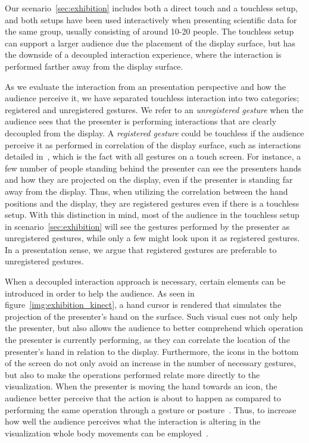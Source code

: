 \documentclass[review,journal]{vgtc}         %
\begin{document}
Our scenario~\ref{sec:exhibition} includes both a direct touch and a touchless setup, and both setups have been used interactively when presenting scientific data for the same group, usually consisting of around 10-20 people.
The touchless setup can support a larger audience due the placement of the display surface, but has the downside of a decoupled interaction experience, where the interaction is performed farther away from the display surface.

As we evaluate the interaction from an presentation perspective and how the audience perceive it, we have separated touchless interaction into two categories; registered and unregistered gestures.
We refer to an \emph{unregistered gesture} when the audience sees that the presenter is performing interactions that are clearly decoupled from the display. 
A \emph{registered gesture} could be touchless if the audience perceive it as performed in correlation of the display surface, such as interactions detailed in~\cite{Bezerianos:2007:DSU:1467769}, which is the fact with all gestures on a touch screen. 
For instance, a few number of people standing behind the presenter can see the presenters hands and how they are projected on the display, even if the presenter is standing far away from the display.
Thus, when utilizing the correlation between the hand positions and the display, they are registered gestures even if there is a touchless setup.
With this distinction in mind, most of the audience in the touchless setup in scenario~\ref{sec:exhibition} will see the gestures performed by the presenter as unregistered gestures, while only a few might look upon it as registered gestures.
In a presentation sense, we argue that registered gestures are preferable to unregistered gestures.
 
When a decoupled interaction approach is necessary, certain elements can be introduced in order to help the audience.
As seen in figure~\ref{img:exhibition_kinect}, a hand cursor is rendered that simulates the projection of the presenter's hand on the surface.
Such visual cues not only help the presenter, but also allows the audience to better comprehend which operation the presenter is currently performing, as they can correlate the location of the presenter's hand in relation to the display.
Furthermore, the icons in the bottom of the screen do not only avoid an increase in the number of necessary gestures, but also to make the operations performed relate more directly to the visualization. 
When the presenter is moving the hand towards an icon, the audience better perceive that the action is about to happen as compared to performing the same operation through a gesture or posture~\cite{isenberg:hal-00781237}. 
Thus, to increase how well the audience perceives what the interaction is altering in the visualization whole body movements can be employed~\cite{978-0-85729-432-6, Shoemaker:2010:BIT:1868914.1868967}. 
\end{document}
